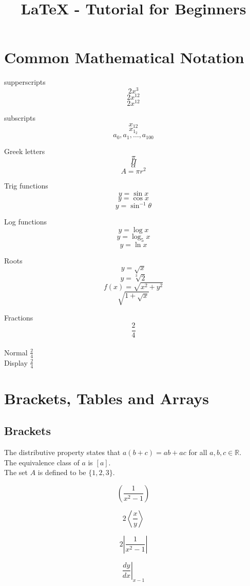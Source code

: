 \documentclass[12pt]{article}
\title{LaTeX - Tutorial for Beginners}
\date{}
\begin{document}
	\tableofcontents
	\maketitle
	\section{Common Mathematical Notation}
	
	\leavevmode
	
	supperscripts $$2x^3$$
	$$2x^12$$
	$$2x^{12}$$
	
	subscripts
	$$x_{12}$$
	$$x_{1_2}$$
	$$a_0, a_1, \ldots, a_{100}$$
	
	Greek letters
	$$\pi$$
	$$\Pi$$
	$$\alpha$$
	$$A = \pi r^2$$
	
	Trig functions
	$$y = \sin x$$
	$$y = \cos x$$
	$$y = \sin^{-1} \theta$$
	
	Log functions
	$$y = \log x$$
	$$y = \log_5 x$$
	$$y = \ln x$$
	
	Roots
	$$y = \sqrt{x}$$
	$$y = \sqrt[3]{2}$$
	$$f(x) = \sqrt{x^2 + y^2}$$
	$$\sqrt{1+\sqrt{x}}$$
	
	Fractions
	$$\frac{2}{4}$$\\
	
	Normal $\frac{2}{4}$\\[16pt]
	
	Display $\displaystyle \frac{2}{4}$
	
	\section{Brackets, Tables and Arrays}
	\subsection{Brackets}
	
	\leavevmode
	
	The distributive property states that $a(b+c) = ab + ac$ for all $a, b, c \in \mathbb{R}$.\\
	
	The equivalence class of $a$ is $[a]$.\\
	
	The set $A$ is defined to be $\{1, 2, 3\}$.
	
	$$\left(\frac{1}{x^2 - 1}\right)$$
	
	$$2\left \langle \frac{x}{y} \right \rangle$$
	
	$$2\left|\frac{1}{x^2 - 1} \right|$$
	
	$$ \left. \frac{dy}{dx} \right|_{x - 1}$$
\end{document}
